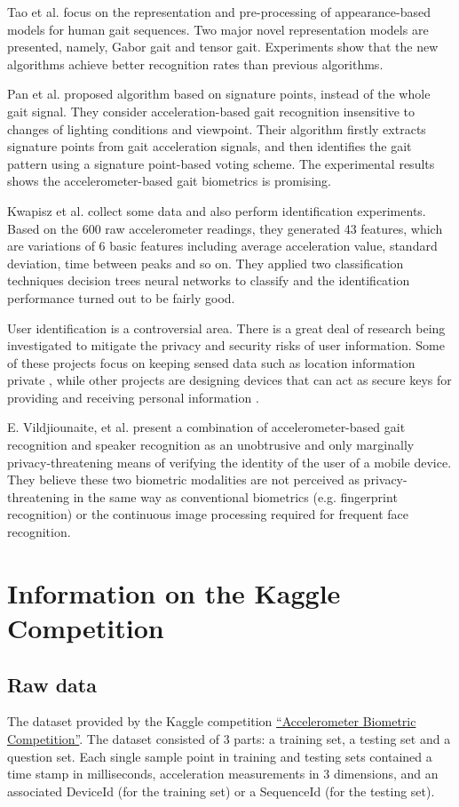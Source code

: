 \documentclass{article} %
\begin{document}
Tao et al.\cite{Tao:ToPAMI2007} focus on the representation and pre-processing of appearance-based models for human gait sequences. Two major novel representation models are presented, namely, Gabor gait and tensor gait. Experiments show that the new algorithms achieve better recognition rates than previous algorithms.

Pan et al.\cite{Pan:EL2009} proposed algorithm based on signature points, instead of the whole gait signal. They consider acceleration-based gait recognition insensitive to changes of lighting conditions and viewpoint. Their algorithm firstly extracts signature points from gait acceleration signals, and then identifies the gait pattern using a signature point-based voting scheme. The experimental results shows the accelerometer-based gait biometrics is promising. 

Kwapisz et al.\cite{Kwapisz:BTAS2009} collect some data and also perform identification experiments. Based on the 600 raw accelerometer readings, they generated 43 features, which are variations of 6 basic features including average acceleration value, standard deviation, time between peaks and so on. They applied two classification techniques decision trees neural networks to classify and the identification performance turned out to be fairly good.

User identification is a controversial area. There is a great deal of research being investigated to mitigate the privacy and security risks of user information. Some of these projects focus on keeping sensed data such as location information private \cite{Cho:ISA2004}, while other projects are designing devices that can act as secure keys for providing and receiving personal information \cite{Zhu:PCC2006}. 

E. Vildjiounaite, et al.\cite{Vildjiounaite:PC2006} present a combination of accelerometer-based gait recognition and speaker recognition as an unobtrusive and only marginally privacy-threatening means of verifying the identity of the user of a mobile device. They believe these two biometric modalities are not perceived as privacy-threatening in the same way as conventional biometrics (e.g. fingerprint recognition) or the continuous image processing required for frequent face recognition.

\section{Information on the Kaggle Competition}
\subsection{Raw data}
The dataset provided by the Kaggle competition \href{http://www.kaggle.com/c/accelerometer-biometric-competition}{``Accelerometer Biometric Competition''}. The dataset consisted of 3 parts: a training set, a testing set and a question set. Each single sample point in training and testing sets contained a time stamp in milliseconds, acceleration measurements in 3 dimensions, and an associated DeviceId (for the training set) or a SequenceId (for the testing set). 
\end{document}
